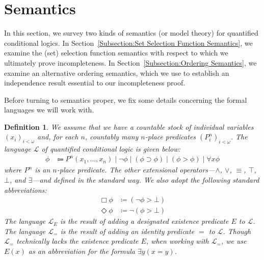 \documentclass[12pt]{article}
\newtheorem{definition}{Definition}
\newcommand{\would}{\mathbin{>}}
\newcommand{\nec}{\mathop{\Box}}
\newcommand{\pos}{\mathop{\Diamond}}
\newcommand{\then}{\mathbin{\supset}}
\newcommand{\ex}{\mathop{\textit{E}}}
\begin{document}
\section{Semantics}
\label{Section:Semantics}


In this section, we survey two kinds of semantics (or model theory) for quantified conditional logics. 
In Section~\ref{Subsection:Set Selection Function Semantics}, we examine the (set) selection function semantics with respect to which we ultimately prove incompleteness. 
In Section~\ref{Subsection:Ordering Semantics}, we examine an alternative ordering semantics, which we use to establish an independence result essential to our incompleteness proof.

Before turning to semantics proper, we fix some details concerning the formal languages we will work with. 

\begin{definition}
\label{def:lang}
    We assume that we have a countable stock of individual variables $(x_i)_{i<\omega}$ and, for each $n$, countably many $n$-place predicates $(P_i^n)_{i<\omega}$. The language $\mathcal{L}$ of quantified conditional logic is given below:
    \begin{align*}
        \phi & \Coloneqq P^n (x_1,\dots,x_n) \mid \neg\phi \mid (\phi \then \phi) \mid (\phi \would \phi) \mid \forall x\phi
    \end{align*}
    where $P^n$ is an $n$-place predicate. 
    The other extensional operators---$\wedge$, $\vee$, $\equiv$, $\top$, $\bot$, and $\exists$---and defined in the standard way. 
    We also adopt the following standard abbreviations:
    \begin{align*}
        \nec\phi & \coloneqq (\neg\phi \would \bot) \\
        \pos\phi & \coloneqq \neg(\phi \would \bot)
    \end{align*}
    The language $\mathcal{L}_{\ex}$ is the result of adding a designated existence predicate $E$ to $\mathcal{L}$. 
    The language $\mathcal{L}_=$ is the result of adding an identity predicate $=$ to $\mathcal{L}$. 
    Though $\mathcal{L}_=$ technically lacks the existence predicate $E$, when working with $\mathcal{L}_=$, we use $E(x)$ as an abbreviation for the formula $\exists y(x = y)$. 
\end{definition}
\end{document}
